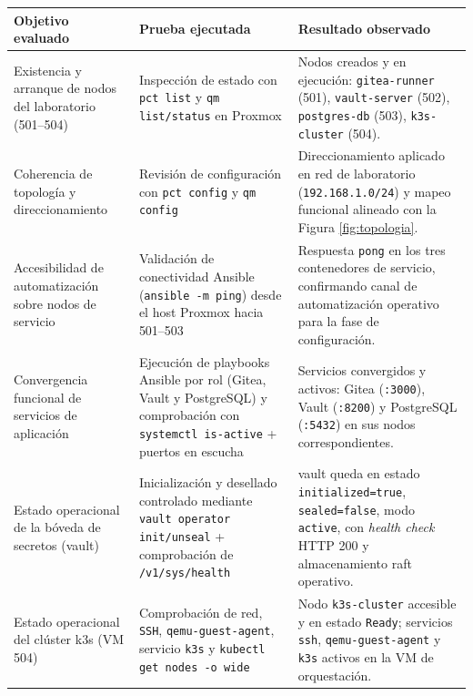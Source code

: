 \documentclass[runningheads]{llncs}
\begin{document}
\begin{table}[htbp]
\centering
\small
\begin{tabular}{>{\raggedright\arraybackslash}p{} >{\raggedright\arraybackslash}p{} >{\raggedright\arraybackslash}p{}}
\toprule
\textbf{Objetivo evaluado} & \textbf{Prueba ejecutada} & \textbf{Resultado observado} \\
\midrule
Existencia y arranque de nodos del laboratorio (501--504) &
Inspección de estado con \texttt{pct list} y \texttt{qm list/status} en Proxmox &
Nodos creados y en ejecución: \texttt{gitea-runner} (501), \texttt{vault-server} (502), \texttt{postgres-db} (503), \texttt{k3s-cluster} (504). \\
\addlinespace
Coherencia de topología y direccionamiento &
Revisión de configuración con \texttt{pct config} y \texttt{qm config} &
Direccionamiento aplicado en red de laboratorio (\texttt{192.168.1.0/24}) y mapeo funcional alineado con la Figura \ref{fig:topologia}. \\
\addlinespace
Accesibilidad de automatización sobre nodos de servicio &
Validación de conectividad Ansible (\texttt{ansible -m ping}) desde el host Proxmox hacia 501--503 &
Respuesta \texttt{pong} en los tres contenedores de servicio, confirmando canal de automatización operativo para la fase de configuración. \\
\addlinespace
Convergencia funcional de servicios de aplicación &
Ejecución de playbooks Ansible por rol (Gitea, Vault y PostgreSQL) y comprobación con \texttt{systemctl is-active} + puertos en escucha &
Servicios convergidos y activos: Gitea (\texttt{:3000}), Vault (\texttt{:8200}) y PostgreSQL (\texttt{:5432}) en sus nodos correspondientes. \\
\addlinespace
Estado operacional de la bóveda de secretos (\gls{vault}) &
Inicialización y desellado controlado mediante \texttt{vault operator init/unseal} + comprobación de \texttt{/v1/sys/health} &
\gls{vault} queda en estado \texttt{initialized=true}, \texttt{sealed=false}, modo \texttt{active}, con \textit{health check} HTTP 200 y almacenamiento \gls{raft} operativo. \\
\addlinespace
Estado operacional del clúster \gls{k3s} (VM 504) &
Comprobación de red, \texttt{SSH}, \texttt{qemu-guest-agent}, servicio \texttt{k3s} y \texttt{kubectl get nodes -o wide} &
Nodo \texttt{k3s-cluster} accesible y en estado \texttt{Ready}; servicios \texttt{ssh}, \texttt{qemu-guest-agent} y \texttt{k3s} activos en la VM de orquestación. \\

\end{tabular}
\end{table}
\end{document}
